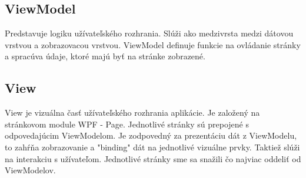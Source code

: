 \documentclass[a4paper, 11pt, onecolumn]{article}
\begin{document}
\subsection*{ViewModel}
Predstavuje logiku užívateľského rozhrania. Slúži ako medzivrsta medzi dátovou vrstvou a zobrazovacou vrstvou.
ViewModel definuje funkcie na ovládanie stránky a spracúva údaje, ktoré majú byť na stránke zobrazené.

\subsection*{View}
View je vizuálna časť užívateľského rozhrania aplikácie. Je založený na stránkovom module WPF - Page. 
Jednotlivé stránky sú prepojené s odpovedajúcim ViewModelom. Je zodpovedný za prezentáciu dát z ViewModelu, to zahŕňa zobrazovanie a "binding"
dát na jednotlivé vizuálne prvky. Taktiež slúži na interakciu s užívateľom. Jednotlivé stránky sme sa snažili čo najviac oddeliť od ViewModelov. 
\end{document}
